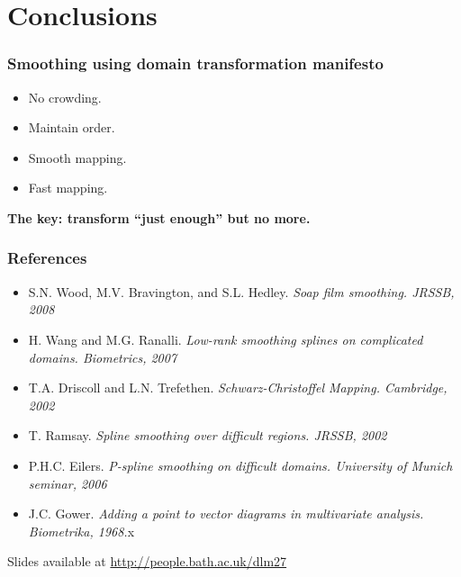 \documentclass[ignorenonframetext]{beamer} %
\newcommand{\bc}{\begin{center}}
\newcommand{\ec}{\end{center}}
\newcommand{\bi}{\begin{itemize}}
\newcommand{\ei}{\end{itemize}}
\begin{document}
\section{Conclusions}

\begin{frame}
	\frametitle{Smoothing using domain transformation manifesto}
          \bi
            \item No crowding.
            \item Maintain order.
            \item Smooth mapping.
            \item Fast mapping.
           \ei
         \bc \textbf{The key: transform ``just enough'' but no more.} \ec
\end{frame}

\begin{frame}
	\frametitle{References}
       \bi
         \item S.N. Wood, M.V. Bravington, and S.L. Hedley. \emph{Soap film smoothing. JRSSB, 2008}
         \item H. Wang and M.G. Ranalli. \emph{Low-rank smoothing splines on complicated domains. Biometrics, 2007}
         \item T.A. Driscoll and L.N. Trefethen. \emph{Schwarz-Christoffel Mapping. Cambridge, 2002}
         \item T. Ramsay. \emph{Spline smoothing over difficult regions. JRSSB, 2002}
         \item P.H.C. Eilers. \emph{P-spline smoothing on difficult domains. University of Munich seminar, 2006}
	\item J.C. Gower. \emph{Adding a point to vector diagrams in multivariate analysis. Biometrika, 1968.}x
        \ei
        Slides available at \url{http://people.bath.ac.uk/dlm27}
\end{frame}
\end{document}
